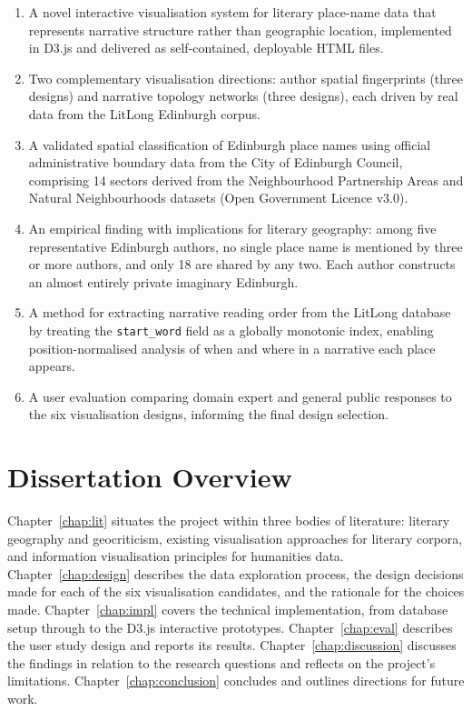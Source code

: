\documentclass[logo,msc]{infthesis}
\begin{document}
\begin{enumerate}[leftmargin=*, label=\arabic*.]
  \item A novel interactive visualisation system for literary place-name data that represents narrative structure rather than geographic location, implemented in D3.js and delivered as self-contained, deployable HTML files.
 
  \item Two complementary visualisation directions: author spatial fingerprints (three designs) and narrative topology networks (three designs), each driven by real data from the LitLong Edinburgh corpus.
 
  \item A validated spatial classification of Edinburgh place names using official administrative boundary data from the City of Edinburgh Council, comprising 14 sectors derived from the Neighbourhood Partnership Areas and Natural Neighbourhoods datasets (Open Government Licence v3.0).
 
  \item An empirical finding with implications for literary geography: among five representative Edinburgh authors, no single place name is mentioned by three or more authors, and only 18 are shared by any two. Each author constructs an almost entirely private imaginary Edinburgh.
 
  \item A method for extracting narrative reading order from the LitLong database by treating the \texttt{start\_word} field as a globally monotonic index, enabling position-normalised analysis of when and where in a narrative each place appears.
 
  \item A user evaluation comparing domain expert and general public responses to the six visualisation designs, informing the final design selection.
\end{enumerate}
 
\section{Dissertation Overview}
 
Chapter~\ref{chap:lit} situates the project within three bodies of literature: literary geography and geocriticism, existing visualisation approaches for literary corpora, and information visualisation principles for humanities data. Chapter~\ref{chap:design} describes the data exploration process, the design decisions made for each of the six visualisation candidates, and the rationale for the choices made. Chapter~\ref{chap:impl} covers the technical implementation, from database setup through to the D3.js interactive prototypes. Chapter~\ref{chap:eval} describes the user study design and reports its results. Chapter~\ref{chap:discussion} discusses the findings in relation to the research questions and reflects on the project's limitations. Chapter~\ref{chap:conclusion} concludes and outlines directions for future work.
 
\end{document}
